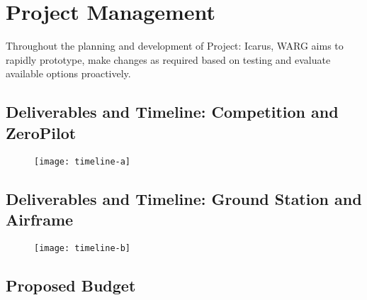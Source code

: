\section{Project Management}
\label{sec:project-management}

Throughout the planning and development of Project: Icarus, WARG aims to rapidly
prototype, make changes as required based on testing and evaluate available options
proactively.

\clearpage

\subsection{Deliverables and Timeline: Competition and ZeroPilot}
\label{sec:timeline}

\begin{figure}[H]
        \centering
        \texttt{[image: timeline-a]}
\end{figure}

\clearpage

\subsection{Deliverables and Timeline: Ground Station and Airframe}
\label{sec:timeline}

\begin{figure}[H]
        \centering
        \texttt{[image: timeline-b]}
\end{figure}

\clearpage

\subsection{Proposed Budget}
\label{sec:budget}


